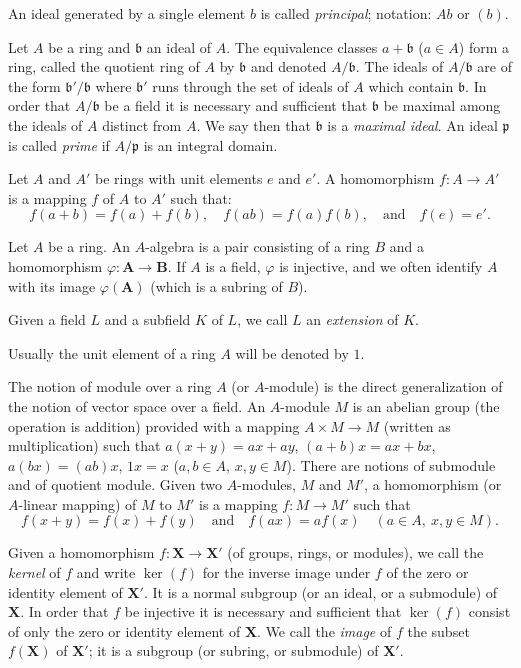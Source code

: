 An ideal generated by a single element $b$ is called \emph{principal};
notation: $Ab$ or $(b)$.

Let $A$ be a ring and $\mathfrak{b}$ an ideal of $A$. The equivalence classes
$a+\mathfrak{b}$ ($a\in A$) form a ring, called the quotient ring of $A$ by
$\mathfrak{b}$ and denoted $A/\mathfrak{b}$. The ideals of $A/\mathfrak{b}$
are of the form $\mathfrak{b}'/\mathfrak{b}$ where $\mathfrak{b}'$ runs
through the set of ideals of $A$ which contain $\mathfrak{b}$. In order that
$A/\mathfrak{b}$ be a field it is necessary and sufficient that
$\mathfrak{b}$ be maximal among the ideals of $A$ distinct from $A$. We say
then that $\mathfrak{b}$ is a \emph{maximal ideal}. An ideal
$\mathfrak{p}$ is called \emph{prime} if $A/\mathfrak{p}$ is an integral
domain.

Let $A$ and $A'$ be rings with unit elements $e$ and $e'$. A homomorphism
$f:A\to A'$ is a mapping $f$ of $A$ to $A'$ such that:
\[
f(a+b)=f(a)+f(b),\quad f(ab)=f(a)f(b),\quad\text{and}\quad f(e)=e'.
\]

Let $A$ be a ring. An $A$-algebra is a pair consisting of a ring $B$ and a
homomorphism $\varphi:\mathbf{A}\to\mathbf{B}$. If $A$ is a field,
$\varphi$ is injective, and we often identify $A$ with its image
$\varphi(\mathbf{A})$ (which is a subring of $B$).

Given a field $L$ and a subfield $K$ of $L$, we call $L$ an
\emph{extension} of $K$.

Usually the unit element of a ring $A$ will be denoted by $1$.

The notion of module over a ring $A$ (or $A$-module) is the direct
generalization of the notion of vector space over a field. An $A$-module $M$
is an abelian group (the operation is addition) provided with a mapping
$A\times M\to M$ (written as multiplication) such that
$a(x+y)=ax+ay$, $(a+b)x=ax+bx$, $a(bx)=(ab)x$, $1x=x$
($a,b\in A$, $x,y\in M$). There are notions of submodule and of quotient
module. Given two $A$-modules, $M$ and $M'$, a homomorphism (or $A$-linear
mapping) of $M$ to $M'$ is a mapping $f:M\to M'$ such that
\[
f(x+y)=f(x)+f(y)\quad\text{and}\quad f(ax)=af(x)\quad(a\in A,\ x,y\in M).
\]

Given a homomorphism $f:\mathbf{X}\to\mathbf{X}'$ (of groups, rings, or
modules), we call the \emph{kernel} of $f$ and write
$\ker(f)$ for the inverse image under $f$ of the zero or identity element of
$\mathbf{X}'$. It is a normal subgroup (or an ideal, or a submodule) of
$\mathbf{X}$. In order that $f$ be injective it is necessary and sufficient
that $\ker(f)$ consist of only the zero or identity element of
$\mathbf{X}$. We call the \emph{image} of $f$ the subset $f(\mathbf{X})$
of $\mathbf{X}'$; it is a subgroup (or subring, or submodule) of
$\mathbf{X}'$.

